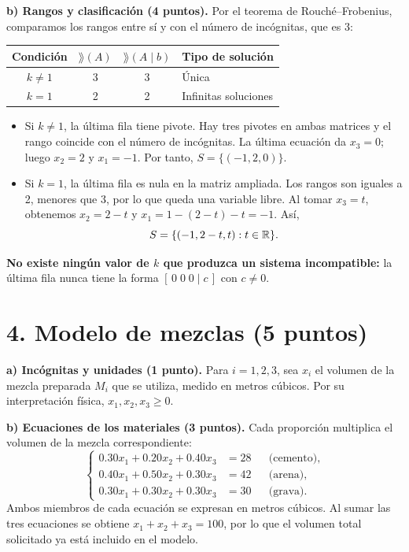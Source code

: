\documentclass[10pt,a4]{examenEPN0}
\begin{document}
\noindent\textbf{b) Rangos y clasificación (4 puntos).}
Por el teorema de Rouché--Frobenius, comparamos los rangos entre sí
y con el número de incógnitas, que es 3:
\begin{center}
    \begin{tabular}{c|c|c|l}
        Condición & $\rang(A)$ & $\rang(A\mid b)$ & Tipo de solución\\
        \hline
        $k\ne1$ & 3 & 3 & Única\\
        $k=1$ & 2 & 2 & Infinitas soluciones
    \end{tabular}
\end{center}
\begin{itemize}
    \item Si $k\ne1$, la última fila tiene pivote. Hay tres pivotes en
          ambas matrices y el rango coincide con el número de incógnitas.
          La última ecuación da $x_3=0$; luego $x_2=2$ y $x_1=-1$.
          Por tanto, $S=\{(-1,2,0)\}$.
    \item Si $k=1$, la última fila es nula en la matriz ampliada.
          Los rangos son iguales a 2, menores que 3, por lo que queda una
          variable libre. Al tomar $x_3=t$, obtenemos $x_2=2-t$ y
          $x_1=1-(2-t)-t=-1$. Así,
          \[
              S=\{(-1,2-t,t):t\in\mathbb{R}\}.
          \]
\end{itemize}
\textbf{No existe ningún valor de $k$ que produzca un sistema incompatible:}
la última fila nunca tiene la forma $[\,0\;0\;0\mid c\,]$ con $c\ne0$.

\section*{4. Modelo de mezclas (5 puntos)}
\noindent\textbf{a) Incógnitas y unidades (1 punto).}
Para $i=1,2,3$, sea $x_i$ el volumen de la mezcla preparada $M_i$
que se utiliza, medido en metros cúbicos. Por su interpretación física,
$x_1,x_2,x_3\ge0$.

\noindent\textbf{b) Ecuaciones de los materiales (3 puntos).}
Cada proporción multiplica el volumen de la mezcla correspondiente:
\[
    \left\{\begin{aligned}
        0.30x_1+0.20x_2+0.40x_3&=28 &&\text{(cemento)},\\
        0.40x_1+0.50x_2+0.30x_3&=42 &&\text{(arena)},\\
        0.30x_1+0.30x_2+0.30x_3&=30 &&\text{(grava)}.
    \end{aligned}\right.
\]
Ambos miembros de cada ecuación se expresan en metros cúbicos.
Al sumar las tres ecuaciones se obtiene $x_1+x_2+x_3=100$, por lo que
el volumen total solicitado ya está incluido en el modelo.
\end{document}

